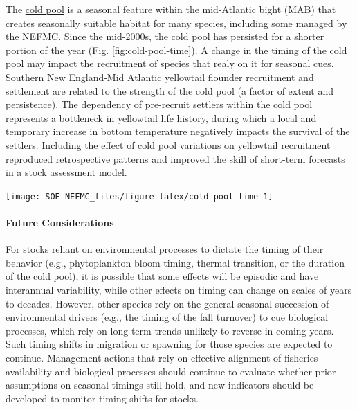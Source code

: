 \documentclass[
  10pt,
]{article}
\let\origfigure\figure
\let\endorigfigure\endfigure
\renewenvironment{figure}[1][2] {
    \expandafter\origfigure\expandafter[H]
} {
    \endorigfigure
}
\begin{document}
The \href{https://noaa-edab.github.io/catalog/cold-pool-index.html}{cold pool} is a seasonal feature within the mid-Atlantic bight (MAB) that creates seasonally suitable habitat for many species, including some managed by the NEFMC. Since the mid-2000s, the cold pool has persisted for a shorter portion of the year (Fig. \ref{fig:cold-pool-time}). A change in the timing of the cold pool may impact the recruitment of species that realy on it for seasonal cues. Southern New England-Mid Atlantic yellowtail flounder recruitment and settlement are related to the strength of the cold pool (a factor of extent and persistence). The dependency of pre-recruit settlers within the cold pool represents a bottleneck in yellowtail life history, during which a local and temporary increase in bottom temperature negatively impacts the survival of the settlers. Including the effect of cold pool variations on yellowtail recruitment reproduced retrospective patterns and improved the skill of short-term forecasts in a stock assessment model.

\begin{figure}

{\centering \texttt{[image: SOE-NEFMC\_files/figure-latex/cold-pool-time-1]} 

}

\caption{Cold pool persistence index based on bias-corrected ROMS-NWA (open circles) and GLORYS (closed circles).}\label{fig:cold-pool-time}
\end{figure}

\hypertarget{future-considerations-1}{%
\paragraph{Future Considerations}\label{future-considerations-1}}

For stocks reliant on environmental processes to dictate the timing of their behavior (e.g., phytoplankton bloom timing, thermal transition, or the duration of the cold pool), it is possible that some effects will be episodic and have interannual variability, while other effects on timing can change on scales of years to decades. However, other species rely on the general seasonal succession of environmental drivers (e.g., the timing of the fall turnover) to cue biological processes, which rely on long-term trends unlikely to reverse in coming years. Such timing shifts in migration or spawning for those species are expected to continue. Management actions that rely on effective alignment of fisheries availability and biological processes should continue to evaluate whether prior assumptions on seasonal timings still hold, and new indicators should be developed to monitor timing shifts for stocks.
\end{document}
